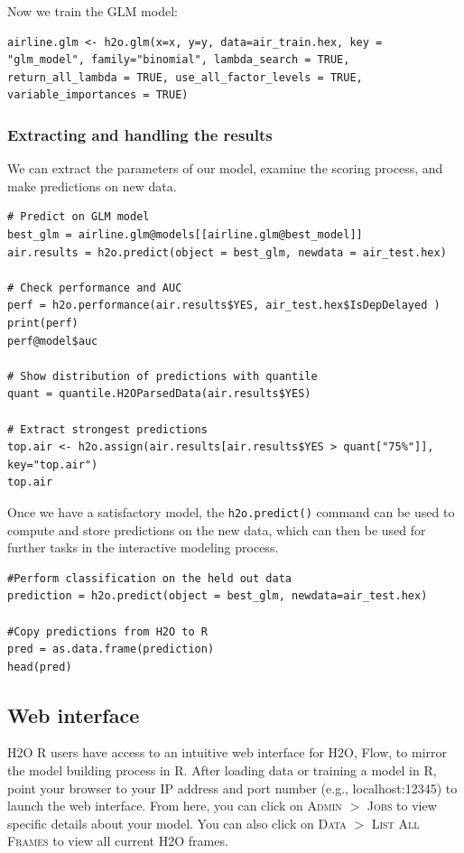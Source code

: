 Now we train the GLM model:

\begin{lstlisting}[style=R]
airline.glm <- h2o.glm(x=x, y=y, data=air_train.hex, key = "glm_model", family="binomial", lambda_search = TRUE, return_all_lambda = TRUE, use_all_factor_levels = TRUE, variable_importances = TRUE)
\end{lstlisting}

\subsubsection{Extracting and handling the results} \label{3.2.1}

We can extract the parameters of our model, examine the scoring process, and make predictions on new data.

\begin{lstlisting}[style=R]
# Predict on GLM model
best_glm = airline.glm@models[[airline.glm@best_model]]
air.results = h2o.predict(object = best_glm, newdata = air_test.hex)

# Check performance and AUC
perf = h2o.performance(air.results$YES, air_test.hex$IsDepDelayed )
print(perf)
perf@model$auc

# Show distribution of predictions with quantile
quant = quantile.H2OParsedData(air.results$YES)

# Extract strongest predictions
top.air <- h2o.assign(air.results[air.results$YES > quant["75%"]], key="top.air")
top.air
\end{lstlisting}

Once we have a satisfactory model, the \texttt{h2o.predict()} command can be used to compute and store predictions on the new data, which can then be used for further tasks in the interactive modeling process.
\begin{lstlisting}[style=R]
#Perform classification on the held out data
prediction = h2o.predict(object = best_glm, newdata=air_test.hex)

#Copy predictions from H2O to R
pred = as.data.frame(prediction)
head(pred)
\end{lstlisting}

\subsection{Web interface} \label{3.3}
H2O R users have access to an intuitive web interface for H2O, Flow, to mirror the model building process in R. After loading data or training a model in R, point your browser to your IP address and port number (e.g., localhost:12345) to launch the web interface. From here, you can click on \textsc{Admin} $>$ \textsc{Jobs} to view specific details about your model. You can also click on \textsc{Data} $>$ \textsc{List All Frames} to view all current H2O frames. 


